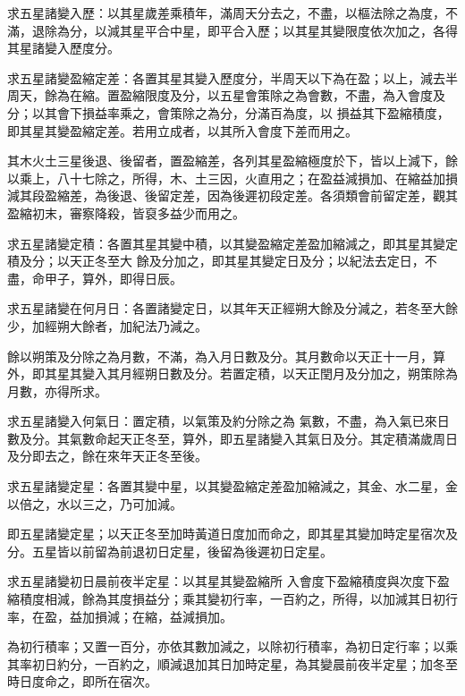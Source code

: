 \begin{pinyinscope}
 求五星諸變入歷：以其星歲差乘積年，滿周天分去之，不盡，以樞法除之為度，不滿，退除為分，以減其星平合中星，即平合入歷；以其星其變限度依次加之，各得其星諸變入歷度分。



 求五星諸變盈縮定差：各置其星其變入歷度分，半周天以下為在盈；以上，減去半周天，餘為在縮。置盈縮限度及分，以五星會策除之為會數，不盡，為入會度及分；以其會下損益率乘之，會策除之為分，分滿百為度，以
 損益其下盈縮積度，即其星其變盈縮定差。若用立成者，以其所入會度下差而用之。



 其木火土三星後退、後留者，置盈縮差，各列其星盈縮極度於下，皆以上減下，餘以乘上，八十七除之，所得，木、土三因，火直用之；在盈益減損加、在縮益加損減其段盈縮差，為後退、後留定差，因為後遲初段定差。各須類會前留定差，觀其盈縮初末，審察降殺，皆裒多益少而用之。



 求五星諸變定積：各置其星其變中積，以其變盈縮定差盈加縮減之，即其星其變定積及分；以天正冬至大
 餘及分加之，即其星其變定日及分；以紀法去定日，不盡，命甲子，算外，即得日辰。



 求五星諸變在何月日：各置諸變定日，以其年天正經朔大餘及分減之，若冬至大餘少，加經朔大餘者，加紀法乃減之。



 餘以朔策及分除之為月數，不滿，為入月日數及分。其月數命以天正十一月，算外，即其星其變入其月經朔日數及分。若置定積，以天正閏月及分加之，朔策除為月數，亦得所求。



 求五星諸變入何氣日：置定積，以氣策及約分除之為
 氣數，不盡，為入氣已來日數及分。其氣數命起天正冬至，算外，即五星諸變入其氣日及分。其定積滿歲周日及分即去之，餘在來年天正冬至後。



 求五星諸變定星：各置其變中星，以其變盈縮定差盈加縮減之，其金、水二星，金以倍之，水以三之，乃可加減。



 即五星諸變定星；以天正冬至加時黃道日度加而命之，即其星其變加時定星宿次及分。五星皆以前留為前退初日定星，後留為後遲初日定星。



 求五星諸變初日晨前夜半定星：以其星其變盈縮所
 入會度下盈縮積度與次度下盈縮積度相減，餘為其度損益分；乘其變初行率，一百約之，所得，以加減其日初行率，在盈，益加損減；在縮，益減損加。



 為初行積率；又置一百分，亦依其數加減之，以除初行積率，為初日定行率；以乘其率初日約分，一百約之，順減退加其日加時定星，為其變晨前夜半定星；加冬至時日度命之，即所在宿次。




\end{pinyinscope}
